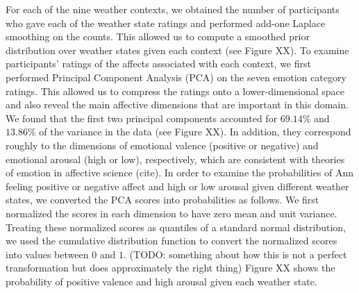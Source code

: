 \documentclass[10pt,letterpaper]{article}
\begin{document}
\begin{figure}[t]
\end{figure}
For each of the nine weather contexts, we obtained the number of participants who gave each of the weather state ratings and performed add-one Laplace smoothing on the counts. This allowed us to compute a smoothed prior distribution over weather states given each context (see Figure XX). 
%
To examine participants' ratings of the affects associated with each context, we first performed Principal Component Analysis (PCA) on the seven emotion category ratings. This allowed us to compress the ratings onto a lower-dimensional space and also reveal the main affective dimensions that are important in this domain. We found that the first two principal components accounted for $69.14\%$ and $13.86\%$ of the variance in the data (see Figure XX). In addition, they correspond roughly to the dimensions of emotional valence (positive or negative) and emotional arousal (high or low), respectively, which are consistent with theories of emotion in affective science (cite). 
In order to examine the probabilities of Ann feeling positive or negative affect and high or low arousal given different weather states, we converted the PCA scores into probabilities as follows. We first normalized the scores in each dimension to have zero mean and unit variance. Treating these normalized scores as quantiles of a standard normal distribution, we used the cumulative distribution function to convert the normalized scores into values between $0$ and $1$. (TODO: something about how this is not a perfect transformation but does approximately the right thing) Figure XX shows the probability of positive valence and high arousal given each weather state.
\end{document}
